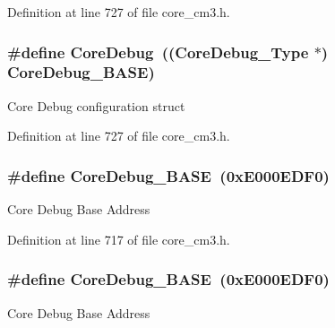 Definition at line 727 of file core\+\_\+cm3.\+h.

\subsubsection[{\texorpdfstring{Core\+Debug}{CoreDebug}}]{\setlength{\rightskip}{0pt plus 5cm}\#define Core\+Debug~(({\bf Core\+Debug\+\_\+\+Type} $\ast$)     {\bf Core\+Debug\+\_\+\+B\+A\+SE})}\hypertarget{group___c_m_s_i_s___c_m3__core__register_gab6e30a2b802d9021619dbb0be7f5d63d}{}\label{group___c_m_s_i_s___c_m3__core__register_gab6e30a2b802d9021619dbb0be7f5d63d}
Core Debug configuration struct 

Definition at line 727 of file core\+\_\+cm3.\+h.

\subsubsection[{\texorpdfstring{Core\+Debug\+\_\+\+B\+A\+SE}{CoreDebug_BASE}}]{\setlength{\rightskip}{0pt plus 5cm}\#define Core\+Debug\+\_\+\+B\+A\+SE~(0x\+E000\+E\+D\+F0)}\hypertarget{group___c_m_s_i_s___c_m3__core__register_ga680604dbcda9e9b31a1639fcffe5230b}{}\label{group___c_m_s_i_s___c_m3__core__register_ga680604dbcda9e9b31a1639fcffe5230b}
Core Debug Base Address 

Definition at line 717 of file core\+\_\+cm3.\+h.

\subsubsection[{\texorpdfstring{Core\+Debug\+\_\+\+B\+A\+SE}{CoreDebug_BASE}}]{\setlength{\rightskip}{0pt plus 5cm}\#define Core\+Debug\+\_\+\+B\+A\+SE~(0x\+E000\+E\+D\+F0)}\hypertarget{group___c_m_s_i_s___c_m3__core__register_ga680604dbcda9e9b31a1639fcffe5230b}{}\label{group___c_m_s_i_s___c_m3__core__register_ga680604dbcda9e9b31a1639fcffe5230b}
Core Debug Base Address 

